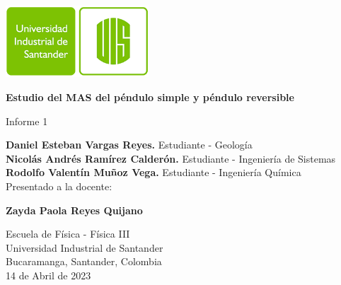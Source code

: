 \begin{titlepage}
    \begin{center}
        \includegraphics[width=0.4\textwidth]{../general-images/uis-logo.png}
        
        \vspace{0.5cm}
        \LARGE
        \textbf{Estudio del MAS del péndulo simple y péndulo reversible}
        
        \vspace{0.5cm}
        \large
        Informe 1
        
        \vfill
        
        \textbf{Daniel Esteban Vargas Reyes.} Estudiante - Geología\\
        \textbf{Nicolás Andrés Ramírez Calderón.} Estudiante - Ingeniería de Sistemas\\ 
        \textbf{Rodolfo Valentín Muñoz Vega.} Estudiante - Ingeniería Química\\

        \vspace{1.0cm}
        Presentado a la docente:
        
        \textbf{Zayda Paola Reyes Quijano}
        
        \vfill
        
        Escuela de Física - Física III\\
        Universidad Industrial de Santander\\
        Bucaramanga, Santander, Colombia\\
        14 de Abril de 2023        
    \end{center}
\end{titlepage}
